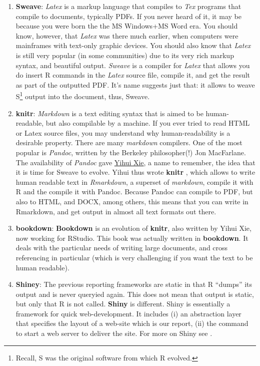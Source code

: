 \documentclass[]{book}
\theoremstyle{definition}
\theoremstyle{definition}
\theoremstyle{remark}
\begin{document}
\begin{enumerate}
\def\labelenumi{\arabic{enumi}.}
\item
  \textbf{Sweave}: \emph{Latex} is a markup language that compiles to
  \emph{Tex} programs that compile to documents, typically PDFs. If you
  never heard of it, it may be because you were born the the MS
  Windows+MS Word era. You should know, however, that \emph{Latex} was
  there much earlier, when computers were mainframes with text-only
  graphic devices. You should also know that \emph{Latex} is still very
  popular (in some communities) due to its very rich markup syntax, and
  beautiful output. \emph{Sweave} \citep{leisch2002sweave} is a compiler
  for \emph{Latex} that allows you do insert R commands in the
  \emph{Latex} source file, compile it, and get the result as part of
  the outputted PDF. It's name suggests just that: it allows to weave
  S\footnote{Recall, S was the original software from which R evolved.}
  output into the document, thus, Sweave.
\item
  \textbf{knitr}: \emph{Markdown} is a text editing syntax that is aimed
  to be human-readable, but also compilable by a machine. If you ever
  tried to read HTML or Latex source files, you may understand why
  human-readability is a desirable property. There are many
  \emph{markdown} compilers. One of the most popular is \emph{Pandoc},
  written by the Berkeley philosopher(!) Jon MacFarlane. The
  availability of \emph{Pandoc} gave \href{}{Yihui Xie}, a name to
  remember, the idea that it is time for Sweave to evolve. Yihui thus
  wrote \textbf{knitr} \citep{xie2015dynamic}, which allows to write
  human readable text in \emph{Rmarkdown}, a superset of
  \emph{markdown}, compile it with R and the compile it with Pandoc.
  Because Pandoc can compile to PDF, but also to HTML, and DOCX, among
  others, this means that you can write in Rmarkdown, and get output in
  almost all text formats out there.
\item
  \textbf{bookdown}: \textbf{Bookdown} \citep{xie2016bookdown} is an
  evolution of \textbf{knitr}, also written by Yihui Xie, now working
  for RStudio. This book was actually written in \textbf{bookdown}. It
  deals with the particular needs of writing large documents, and cross
  referencing in particular (which is very challenging if you want the
  text to be human readable).
\item
  \textbf{Shiney}: The previous reporting frameworks are static in that
  R ``dumps'' its output and is never queryied again. This does not mean
  that output is static, but only that R is not called. \textbf{Shiny}
  \citep{shiney} is different. Shiny is essentially a framework for
  quick web-development. It includes (i) an abstraction layer that
  specifies the layout of a web-site which is our report, (ii) the
  command to start a web server to deliver the site. For more on Shiny
  see \citet{shiney}.
\end{enumerate}
\end{document}
